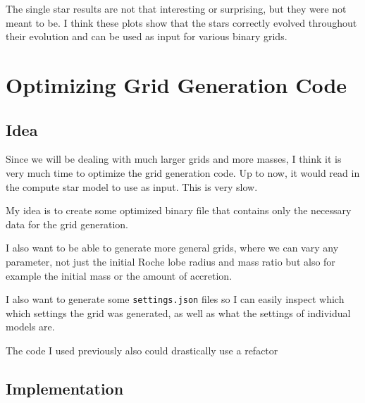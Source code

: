 \documentclass[a4paper,10pt]{article}
\begin{document}
\begin{figure}[ht]
    \centering
\end{figure}

The single star results are not that interesting or surprising, but they were not meant to be. I think these plots show that the stars correctly evolved throughout their evolution and can be used as input for various binary grids.

\nextpage
\section{Optimizing Grid Generation Code}

\subsection{Idea}
Since we will be dealing with much larger grids and more masses, I think it is very much time to optimize the grid generation code. Up to now, it would read in the compute star model to use as input. This is very slow.

My idea is to create some optimized binary file that contains only the necessary data for the grid generation.

I also want to be able to generate more general grids, where we can vary any parameter, not just the initial Roche lobe radius and mass ratio but also for example the initial mass or the amount of accretion.

I also want to generate some \lstinline[style=output, breaklines=true]|settings.json| files so I can easily inspect which which settings the grid was generated, as well as what the settings of individual models are.

The code I used previously also could drastically use a refactor

\subsection{Implementation}
\end{document}
